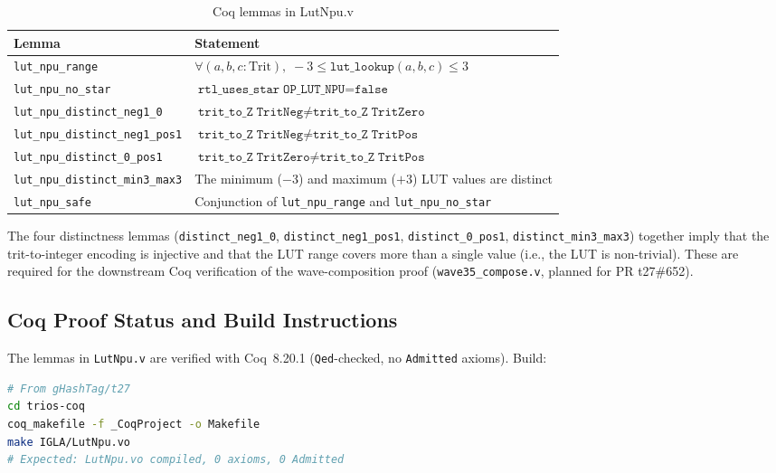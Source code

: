 \begin{table}[ht]
\centering
\caption{Coq lemmas in LutNpu.v}
\label{tab:coq_lemmas}
\begin{tabular}{lp{7cm}}
\hline
Lemma & Statement \\
\hline
\texttt{lut\_npu\_range} & $\forall (a,b,c : \mathrm{Trit}),\; -3 \leq \texttt{lut\_lookup}(a,b,c) \leq 3$ \\
\texttt{lut\_npu\_no\_star} & $\texttt{rtl\_uses\_star}\;\texttt{OP\_LUT\_NPU} = \texttt{false}$ \\
\texttt{lut\_npu\_distinct\_neg1\_0} & $\texttt{trit\_to\_Z}\;\texttt{TritNeg} \neq \texttt{trit\_to\_Z}\;\texttt{TritZero}$ \\
\texttt{lut\_npu\_distinct\_neg1\_pos1} & $\texttt{trit\_to\_Z}\;\texttt{TritNeg} \neq \texttt{trit\_to\_Z}\;\texttt{TritPos}$ \\
\texttt{lut\_npu\_distinct\_0\_pos1} & $\texttt{trit\_to\_Z}\;\texttt{TritZero} \neq \texttt{trit\_to\_Z}\;\texttt{TritPos}$ \\
\texttt{lut\_npu\_distinct\_min3\_max3} & The minimum ($-3$) and maximum ($+3$) LUT values are distinct \\
\texttt{lut\_npu\_safe} & Conjunction of \texttt{lut\_npu\_range} and \texttt{lut\_npu\_no\_star} \\
\hline
\end{tabular}
\end{table}

\noindent The four distinctness lemmas (\texttt{distinct\_neg1\_0},
\texttt{distinct\_neg1\_pos1}, \texttt{distinct\_0\_pos1},
\texttt{distinct\_min3\_max3}) together imply that the trit-to-integer encoding
is injective and that the LUT range covers more than a single value (i.e., the
LUT is non-trivial).  These are required for the downstream Coq verification of
the wave-composition proof (\texttt{wave35\_compose.v}, planned for PR
t27\#652).

\subsection{Coq Proof Status and Build Instructions}

The lemmas in \texttt{LutNpu.v} are verified with Coq~8.20.1
(\texttt{Qed}-checked, no \texttt{Admitted} axioms).  Build:

\begin{lstlisting}[language=bash, caption={Coq build for LutNpu.v}]
# From gHashTag/t27
cd trios-coq
coq_makefile -f _CoqProject -o Makefile
make IGLA/LutNpu.vo
# Expected: LutNpu.vo compiled, 0 axioms, 0 Admitted
\end{lstlisting}

